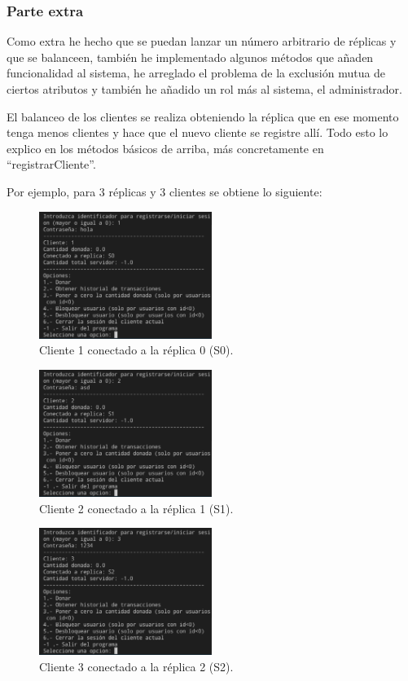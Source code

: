 \documentclass{article}
\begin{document}
\subsubsection{Parte extra}
Como extra he hecho que se puedan lanzar un número arbitrario de réplicas y que se balanceen, también he implementado algunos métodos que añaden funcionalidad al sistema, he arreglado el problema de la exclusión mutua de ciertos atributos y también he añadido un rol más al sistema, el administrador. 

El balanceo de los clientes se realiza obteniendo la réplica que en ese momento tenga menos clientes y hace que el nuevo cliente se registre allí. Todo esto lo explico en los métodos básicos de arriba, más concretamente en ``registrarCliente''.

Por ejemplo, para 3 réplicas y 3 clientes se obtiene lo siguiente:
\begin{figure}[H]
    \centering
    \includegraphics[width=0.5\textwidth]{imagenes/3replicasS0.png}
    \caption{Cliente 1 conectado a la réplica 0 (S0).}
\end{figure}

\begin{figure}[H]
    \centering
    \includegraphics[width=0.5\textwidth]{imagenes/3replicasS1.png}
    \caption{Cliente 2 conectado a la réplica 1 (S1).}
\end{figure}

\begin{figure}[H]
    \centering
    \includegraphics[width=0.5\textwidth]{imagenes/3replicasS2.png}
    \caption{Cliente 3 conectado a la réplica 2 (S2).}
\end{figure}
\end{document}
